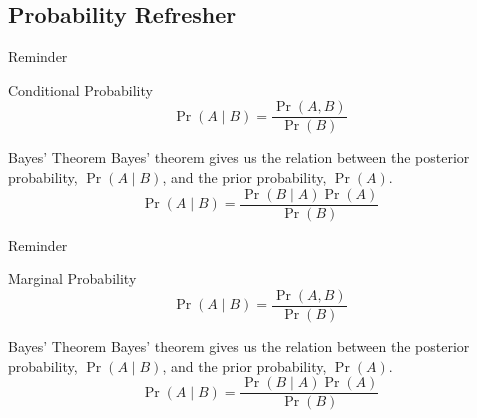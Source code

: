 \documentclass[handout]{beamer}
\begin{document}
\subsection{Probability Refresher}
\begin{frame}{Reminder}
    \begin{block}{Conditional Probability}
        \[ \Pr \left( A \mid B \right) = \frac{\Pr \left( A, B \right)}{\Pr \left( B \right)} \]
    \end{block}
    \begin{block}{Bayes' Theorem}
        Bayes' theorem gives us the relation between the posterior probability, $ \Pr \left( A \mid B \right) $, and the prior probability, $ \Pr \left( A \right) $.
        \[ \Pr \left( A \mid B \right) = \frac{\Pr \left( B \mid A \right) \Pr \left( A \right)}{\Pr \left( B \right)} \]
    \end{block}
\end{frame}
\begin{frame}{Reminder}
    \begin{block}{Marginal Probability}
        \[ \Pr \left( A \mid B \right) = \frac{\Pr \left( A, B \right)}{\Pr \left( B \right)} \]
    \end{block}
    \begin{block}{Bayes' Theorem}
        Bayes' theorem gives us the relation between the posterior probability, $ \Pr \left( A \mid B \right) $, and the prior probability, $ \Pr \left( A \right) $.
        \[ \Pr \left( A \mid B \right) = \frac{\Pr \left( B \mid A \right) \Pr \left( A \right)}{\Pr \left( B \right)} \]
    \end{block}
\end{frame}
\end{document}
